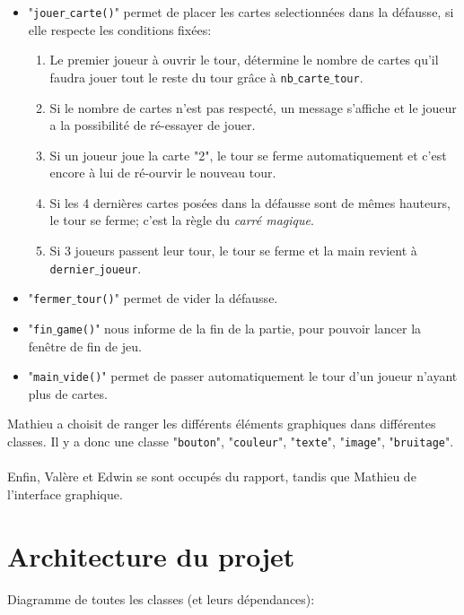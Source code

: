 \documentclass[french,12pt]{article}
\begin{document}
\begin{itemize}
\item "\texttt{jouer$\_$carte()}" permet de placer les cartes selectionnées dans la défausse, si elle respecte les conditions fixées:
\begin{enumerate}
\item Le premier joueur à ouvrir le tour, détermine le nombre de cartes qu'il faudra jouer tout le reste du tour grâce à \texttt{nb$\_$carte$\_$tour}.
\item Si le nombre de cartes n'est pas respecté, un message s'affiche et le joueur a la possibilité de ré-essayer de jouer. 
\item Si un joueur joue la carte "2", le tour se ferme automatiquement et c'est encore à lui de ré-ourvir le nouveau tour.  
\item Si les 4 dernières cartes posées dans la défausse sont de mêmes hauteurs, le tour se ferme; c'est la règle du \textit{carré magique}.
\item Si 3 joueurs passent leur tour, le tour se ferme et la main revient à \texttt{dernier$\_$joueur}. \\
\end{enumerate}

\item "\texttt{fermer$\_$tour()}" permet de vider la défausse.\\

\item "\texttt{fin$\_$game()}" nous informe de la fin de la partie, pour pouvoir lancer la fenêtre de fin de jeu.\\

\item "\texttt{main$\_$vide()}" permet de passer automatiquement le tour d'un joueur n'ayant plus de cartes.
 
\end{itemize}

Mathieu a choisit de ranger les différents éléments graphiques dans différentes classes. Il y a donc une classe "\texttt{bouton}", "\texttt{couleur}", "\texttt{texte}", "\texttt{image}", "\texttt{bruitage}".
\\\\
Enfin, Valère et Edwin se sont occupés du rapport, tandis que Mathieu de l'interface graphique.

\section{Architecture du projet}

Diagramme de toutes les classes (et leurs dépendances):
\end{document}
